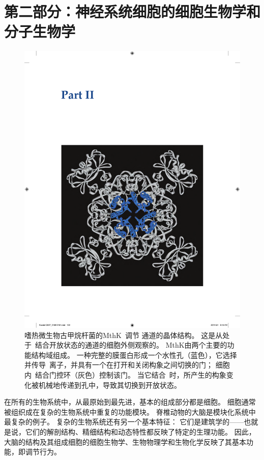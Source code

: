 \chapter*{第二部分：神经系统细胞的细胞生物学和分子生物学}

\begin{figure}[htbp]
	\centering
	\includegraphics[width=0.9\linewidth]{chap07/fig_7_0}
	\caption{嗜热微生物古甲烷杆菌的MthK~调节 通道的晶体结构。
		这是从处于~结合开放状态的通道的细胞外侧观察的。
		MthK由两个主要的功能结构域组成。
		一种完整的膜蛋白形成一个水性孔（蓝色），它选择并传导~离子，并具有一个在打开和关闭构象之间切换的门；
		细胞内~结合门控环（灰色）控制该门。
		当它结合~时，所产生的构象变化被机械地传递到孔中，导致其切换到开放状态。}
	\label{fig:7_0}
\end{figure}


在所有的生物系统中，从最原始到最先进，基本的组成部分都是细胞。
细胞通常被组织成在复杂的生物系统中重复的功能模块。
脊椎动物的大脑是模块化系统中最复杂的例子。
复杂的生物系统还有另一个基本特征：
它们是建筑学的——也就是说，它们的解剖结构、精细结构和动态特性都反映了特定的生理功能。
因此，大脑的结构及其组成细胞的细胞生物学、生物物理学和生物化学反映了其基本功能，即调节行为。


